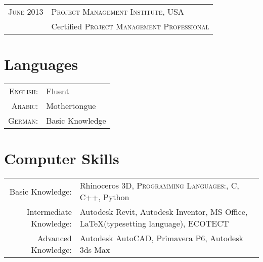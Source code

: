 \documentclass[a4paper,10pt]{article} %
\begin{document}
\begin{tabular}{rl}
\textsc{June} 2013 & \textsc{Project Management Institute}, USA\\
& Certified \textsc{Project Management Professional}\\

\end{tabular}


\section{Languages}

\begin{tabular}{rl}
\textsc{English:} & Fluent\\

\textsc{Arabic:} & Mothertongue\\

\textsc{German:} & Basic Knowledge\\
\end{tabular}


\section{Computer Skills}

\begin{tabular}{rl}
Basic Knowledge: & Rhinoceros 3D, \textsc{Programming Languages:}, C, C++, Python\\

Intermediate Knowledge: & Autodesk Revit, Autodesk Inventor, MS Office, \LaTeX (typesetting language), ECOTECT\\

Advanced Knowledge: & Autodesk AutoCAD, Primavera P6, Autodesk 3ds Max
\end{tabular}

\end{document}
